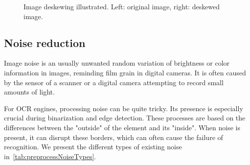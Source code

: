 \begin{figure}[t]
\caption{Image deskewing illustrated. Left: original image, right: deskewed image.}
\label{fig:preprocessDeskewing}
\end{figure}

\subsection{Noise reduction}

Image noise is an usually unwanted random variation of brightness or color information in images, reminding film grain in digital cameras. It is often caused by the sensor of a scanner or a digital camera attempting to record small amounts of light. 

For OCR engines, processing noise can be quite tricky. Its presence is especially crucial during binarization and edge detection. These processes are based on the differences between the "outside" of the element and its "inside". When noise is present, it can disrupt these borders, which can often cause the failure of recognition. We present the different types of existing noise in~\cref{tab:preprocessNoiseTypes}.

